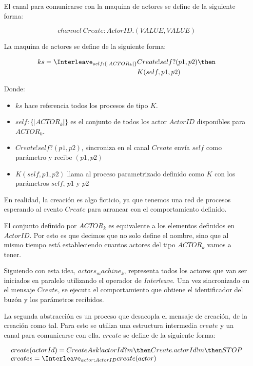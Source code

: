 El canal para comunicarse con la maquina de actores se define de la siguiente forma:

\[
channel\ Create:ActorID.(VALUE, VALUE)
\]


La maquina de actores se define de la siguiente forma:

\begin{align*}
ks = \Interleave_{ self : \{| ACTOR_k |\} } & Create!self?(p1, p2) \then \\
& K(self, p1, p2) 
\end{align*}

Donde:

\begin{itemize}
 \item $ks$ hace referencia todos los procesos de tipo $K$.
 \item $self : \{| ACTOR_k |\}$ es el conjunto de todos los actor $ActorID$ disponibles para $ACTOR_k$.
 \item $Create!self?(p1, p2)$, sincroniza en el canal $Create$ envía $self$ como parámetro y recibe $(p1, p2)$
 \item $K(self, p1, p2)$ llama al proceso parametrizado definido como $K$ con los parámetros $self$, $p1$ y $p2$
\end{itemize}


En realidad, la creación es algo ficticio, ya que tenemos una red de procesos \CSP esperando al evento $Create$ para arrancar con el comportamiento definido. 

El conjunto definido por $ACTOR_k$ es equivalente a los elementos definidos en $ActorID$. Por esto es que decimos que no solo define el nombre, sino que al mismo tiempo está estableciendo cuantos actores del tipo $ACTOR_k$ vamos a tener.

Siguiendo con esta idea, $actors_machine_k$, representa todos los actores que van ser iniciados en paralelo utilizando el operador de \textit{Interleave}. Una vez sincronizado en el mensaje $Create$, se ejecuta el comportamiento que obtiene el identificador del buzón y los parámetros recibidos.

La segunda abstracción es un proceso que desacopla el mensaje de creación, de la creación como tal. Para esto se utiliza una estructura intermedia $create$ y un canal para comunicarse con ella. $create$ se define de la siguiente forma: 

\[
\begin{array}{l}
create(actorId) = CreateAsk!actorId?m \then Create.actorId!m \then STOP \\
creates = \Interleave_{actor : ActorID} create(actor)
\end{array}
\]

